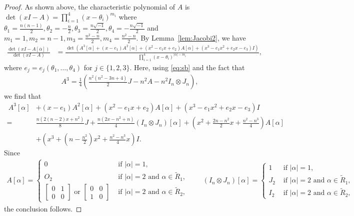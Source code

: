 \documentclass[11pt]{article}
\begin{document}
\begin{proof}
As shown above, the characteristic polynomial of $A$ is $\det (xI-A)=\prod_{i=1}^4(x-\theta_i)^{m_i}$ where $\theta_1=\frac{n(n-1)}{2},\theta_2=-\frac{n}{2},\theta_3=\frac{n\sqrt{-1}}{2},\theta_4=-\frac{n\sqrt{-1}}{2}$ and $m_1=1,m_2=n-1,m_3=\frac{n^2-n}{2},m_4=\frac{n^2-n}{2}$.
By Lemma~\ref{lem:Jacobi2}, 
we have
\begin{align*}
    \frac{\det(xI-A[\overline{\alpha}])}{\det(xI-A)}
    &= \frac{\det \left ( A^3[\alpha]+(x-e_1)A^2[\alpha]+(x^2-e_1x+e_2)A[\alpha]+(x^3-e_1x^2+e_2x-e_3)I \right )}{\prod_{i=1}^4(x-\theta_i)^{|\alpha|-m_i}}, 
\end{align*}
where $e_j=e_j(\theta_1,\ldots,\theta_4)$ for $j\in\{1,2,3\}$. 
Here, using \eqref{eq:sb} and the fact that 
\begin{align*}
A^3=\frac{1}{4}\left(\frac{n^2(n^2-3 n+4)}{2}J-n^2 A-n^2I_n\otimes J_n\right),
\end{align*}
we find that 
\begin{align*}
    \ A^3[\alpha]&+(x-e_1)A^2[\alpha]+(x^2-e_1x+e_2)A[\alpha]+(x^3-e_1x^2+e_2x-e_3)I\\ 
   =&\frac{n (2 (n-2) x+n^2)}{8} J+\frac{n(2 x-n^2+n)}{4} \left(I_n\otimes J_n\right)[\alpha]+\left( x^2+\frac{2n-n^2}{2}x+\frac{n^2-n^3}{4}  \right)A[\alpha]\\
   &+\left(x^3+(n-\frac{n^2}{2})x^2+\frac{n^2-n^3}{4}x\right)I. 
\end{align*}
Since 
\begin{align*}
    A[\alpha]=\begin{cases}
    0 & \text{ if } |\alpha|=1,\\
    O_2  & \text{ if } |\alpha|=2\text{ and }\alpha\in \tilde{R}_1,\\
    \left[\begin{smallmatrix} 0 & 1 \\ 0 & 0 \end{smallmatrix}\right]\text{ or } \left[\begin{smallmatrix} 0 & 0 \\ 1 & 0 \end{smallmatrix}\right] & \text{ if }|\alpha|=2\text{ and } \alpha\in \tilde{R}_2,
    \end{cases}
    \qquad
    (I_n\otimes J_n)[\alpha]=\begin{cases}
    1 & \text{ if } |\alpha|=1,\\
    J_2  & \text{ if } |\alpha|=2\text{ and }\alpha\in \tilde{R}_1,\\
    I_2 & \text{ if } |\alpha|=2\text{ and }\alpha\in \tilde{R}_2,
    \end{cases}
\end{align*}
the conclusion follows. 
\end{proof}
\end{document}
